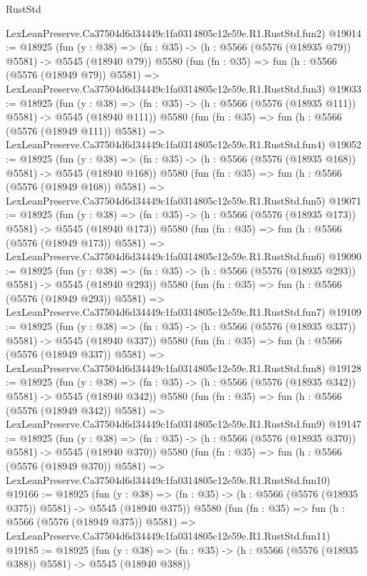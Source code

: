 \begin{lexlean}{RustStd}
\begin{coremodule}
    LexLeanPreserve.Ca37504d6d34449c1fa0314805c12e59e.R1.RustStd.fun2)
@19014 := @18925
    (fun (y : @38) => (fn : @35) -> (h : @5566 (@5576 (@18935 @79)) @5581) -> @5545 (@18940 @79))
    @5580
    (fun (fn : @35) =>
    fun (h : @5566 (@5576 (@18949 @79)) @5581) =>
    LexLeanPreserve.Ca37504d6d34449c1fa0314805c12e59e.R1.RustStd.fun3)
@19033 := @18925
    (fun (y : @38) => (fn : @35) -> (h : @5566 (@5576 (@18935 @111)) @5581) -> @5545 (@18940 @111))
    @5580
    (fun (fn : @35) =>
    fun (h : @5566 (@5576 (@18949 @111)) @5581) =>
    LexLeanPreserve.Ca37504d6d34449c1fa0314805c12e59e.R1.RustStd.fun4)
@19052 := @18925
    (fun (y : @38) => (fn : @35) -> (h : @5566 (@5576 (@18935 @168)) @5581) -> @5545 (@18940 @168))
    @5580
    (fun (fn : @35) =>
    fun (h : @5566 (@5576 (@18949 @168)) @5581) =>
    LexLeanPreserve.Ca37504d6d34449c1fa0314805c12e59e.R1.RustStd.fun5)
@19071 := @18925
    (fun (y : @38) => (fn : @35) -> (h : @5566 (@5576 (@18935 @173)) @5581) -> @5545 (@18940 @173))
    @5580
    (fun (fn : @35) =>
    fun (h : @5566 (@5576 (@18949 @173)) @5581) =>
    LexLeanPreserve.Ca37504d6d34449c1fa0314805c12e59e.R1.RustStd.fun6)
@19090 := @18925
    (fun (y : @38) => (fn : @35) -> (h : @5566 (@5576 (@18935 @293)) @5581) -> @5545 (@18940 @293))
    @5580
    (fun (fn : @35) =>
    fun (h : @5566 (@5576 (@18949 @293)) @5581) =>
    LexLeanPreserve.Ca37504d6d34449c1fa0314805c12e59e.R1.RustStd.fun7)
@19109 := @18925
    (fun (y : @38) => (fn : @35) -> (h : @5566 (@5576 (@18935 @337)) @5581) -> @5545 (@18940 @337))
    @5580
    (fun (fn : @35) =>
    fun (h : @5566 (@5576 (@18949 @337)) @5581) =>
    LexLeanPreserve.Ca37504d6d34449c1fa0314805c12e59e.R1.RustStd.fun8)
@19128 := @18925
    (fun (y : @38) => (fn : @35) -> (h : @5566 (@5576 (@18935 @342)) @5581) -> @5545 (@18940 @342))
    @5580
    (fun (fn : @35) =>
    fun (h : @5566 (@5576 (@18949 @342)) @5581) =>
    LexLeanPreserve.Ca37504d6d34449c1fa0314805c12e59e.R1.RustStd.fun9)
@19147 := @18925
    (fun (y : @38) => (fn : @35) -> (h : @5566 (@5576 (@18935 @370)) @5581) -> @5545 (@18940 @370))
    @5580
    (fun (fn : @35) =>
    fun (h : @5566 (@5576 (@18949 @370)) @5581) =>
    LexLeanPreserve.Ca37504d6d34449c1fa0314805c12e59e.R1.RustStd.fun10)
@19166 := @18925
    (fun (y : @38) => (fn : @35) -> (h : @5566 (@5576 (@18935 @375)) @5581) -> @5545 (@18940 @375))
    @5580
    (fun (fn : @35) =>
    fun (h : @5566 (@5576 (@18949 @375)) @5581) =>
    LexLeanPreserve.Ca37504d6d34449c1fa0314805c12e59e.R1.RustStd.fun11)
@19185 := @18925
    (fun (y : @38) => (fn : @35) -> (h : @5566 (@5576 (@18935 @388)) @5581) -> @5545 (@18940 @388))

\end{coremodule}
\end{lexlean}
